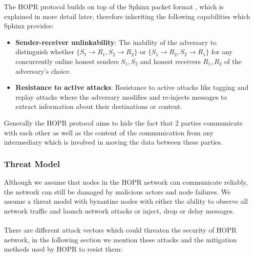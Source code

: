 The HOPR protocol builds on top of the Sphinx packet format \cite{sphinxpaper}, which is explained
in more detail later, therefore inheriting the following capabilities which Sphinx provides:

\begin{itemize}

    \item \textbf{Sender-receiver unlinkability}: The inability of the adversary
        to distinguish whether $\{S_1\rightarrow R_1, S_2\rightarrow R_2\}$ or
        $\{S_1\rightarrow R_2, S_2\rightarrow R_1\}$ for any concurrently online
        honest senders $S_1,S_2$ and honest receivers $R_1,R_2$ of the
        adversary’s choice.

    \item \textbf{Resistance to active attacks}: Resistance to active attacks
        like tagging and replay attacks where the adversary modifies and
        re-injects messages to extract information about their destinations or
        content.

\end{itemize}
Generally the HOPR protocol aims to hide the fact that 2 parties
communicate with each other as well as the content of the communication from any
intermediary which is involved in moving the data between these parties.


\subsubsection{Threat Model}

Although we assume that nodes in the HOPR network can communicate reliably, the
network can still be damaged by malicious actors and node failures. We assume a
threat model with byzantine nodes with either the ability to observe all network
traffic and launch network attacks or inject, drop or delay messages. \\~\\There
are different attack vectors which could threaten the security of HOPR network,
in the following section we mention these attacks and the mitigation methods
used by HOPR to resist them:

